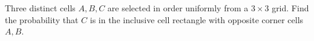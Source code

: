 Three distinct cells $A,B,C$ are selected in order uniformly from a $3\times3$ grid. Find the probability that $C$ is in the inclusive cell rectangle with opposite corner cells $A,B$.
